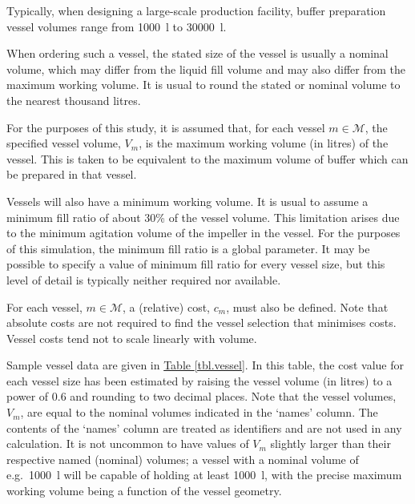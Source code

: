 Typically, when designing a large-scale production facility, buffer preparation
vessel volumes range from \SI{1000}{\litre} to \SI{30000}{\litre}.

When ordering such a vessel, the stated size of the vessel is usually a nominal
volume, which may differ from the liquid fill volume and may also differ from
the maximum working volume.
It is usual to round the stated or nominal volume to the nearest thousand
litres.

For the purposes of this study, it is assumed that, for each vessel
$m \in \mathcal{M}$, the specified vessel volume, $V_{m}$, is the maximum
working volume (in litres) of the vessel. This is taken to be equivalent to
the maximum volume of buffer which can be prepared in that vessel.

Vessels will also have a minimum working volume.
It is usual to assume a minimum fill ratio of about 30\% of the vessel volume.
This limitation arises due to the minimum agitation volume of the impeller in
the vessel.
For the purposes of this simulation, the minimum fill ratio is a global
parameter.
It may be possible to specify a value of minimum fill ratio for every vessel
size, but this level of detail is typically neither required nor available.

For each vessel, $m \in \mathcal{M}$, a (relative) cost, $c_{m}$, must also be
defined.
Note that absolute costs are not required to find the vessel selection that
minimises costs.
Vessel costs tend not to scale linearly with volume.

Sample vessel data are given in \hyperref[tbl.vessel]{Table \ref*{tbl.vessel}}.
In this table, the cost value for each vessel size has been estimated by
raising the vessel volume (in litres) to a power of 0.6 and rounding to two
decimal places.
Note that the vessel volumes, $V_{m}$, are equal to the nominal volumes
indicated in the `names' column.  The contents of the `names' column are
treated as identifiers and are not used in any calculation.
It is not uncommon to have values of $V_{m}$ slightly larger than their
respective named (nominal) volumes; a vessel with a nominal volume of e.g.\
\SI{1000}{\litre} will be capable of holding at least \SI{1000}{\litre}, with
the precise maximum working volume being a function of the vessel geometry.


